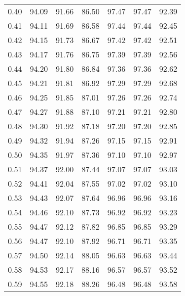 \begin{tabular}{|c|c|c|c|c|c|c|}
      0.40 &     94.09 &     91.66 &      86.50 &   97.47 &      97.47 &         92.39 \\
      0.41 &     94.11 &     91.69 &      86.58 &   97.44 &      97.44 &         92.45 \\
      0.42 &     94.15 &     91.73 &      86.67 &   97.42 &      97.42 &         92.51 \\
      0.43 &     94.17 &     91.76 &      86.75 &   97.39 &      97.39 &         92.56 \\
      0.44 &     94.20 &     91.80 &      86.84 &   97.36 &      97.36 &         92.62 \\
      0.45 &     94.21 &     91.81 &      86.92 &   97.29 &      97.29 &         92.68 \\
      0.46 &     94.25 &     91.85 &      87.01 &   97.26 &      97.26 &         92.74 \\
      0.47 &     94.27 &     91.88 &      87.10 &   97.21 &      97.21 &         92.80 \\
      0.48 &     94.30 &     91.92 &      87.18 &   97.20 &      97.20 &         92.85 \\
      0.49 &     94.32 &     91.94 &      87.26 &   97.15 &      97.15 &         92.91 \\
      0.50 &     94.35 &     91.97 &      87.36 &   97.10 &      97.10 &         92.97 \\
      0.51 &     94.37 &     92.00 &      87.44 &   97.07 &      97.07 &         93.03 \\
      0.52 &     94.41 &     92.04 &      87.55 &   97.02 &      97.02 &         93.10 \\
      0.53 &     94.43 &     92.07 &      87.64 &   96.96 &      96.96 &         93.16 \\
      0.54 &     94.46 &     92.10 &      87.73 &   96.92 &      96.92 &         93.23 \\
      0.55 &     94.47 &     92.12 &      87.82 &   96.85 &      96.85 &         93.29 \\
      0.56 &     94.47 &     92.10 &      87.92 &   96.71 &      96.71 &         93.35 \\
      0.57 &     94.50 &     92.14 &      88.05 &   96.63 &      96.63 &         93.44 \\
      0.58 &     94.53 &     92.17 &      88.16 &   96.57 &      96.57 &         93.52 \\
      0.59 &     94.55 &     92.18 &      88.26 &   96.48 &      96.48 &         93.58 \\

\end{tabular}
